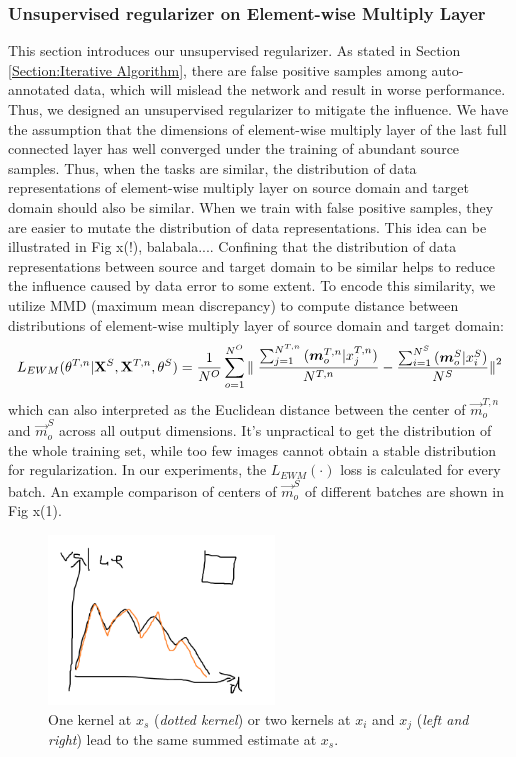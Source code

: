 \documentclass[runningheads]{llncs}
\begin{document}
\subsubsection{Unsupervised regularizer on Element-wise Multiply Layer}

This section introduces our unsupervised regularizer. As stated in Section \ref{Section:Iterative Algorithm}, there are false positive samples among auto-annotated data, which will mislead the network and result in worse performance. Thus, we designed an unsupervised regularizer to mitigate the influence. We have the assumption that the dimensions of element-wise multiply layer of the last full connected layer has well converged under the training of abundant source samples. Thus, when the tasks are similar, the distribution of data representations of element-wise multiply layer on source domain and target domain should also be similar. When we train with false positive samples, they are easier to mutate the distribution of data representations. This idea can be illustrated in Fig x(!), balabala.... Confining that the distribution of data representations between source and target domain to be similar helps to reduce the influence caused by data error to some extent. To encode this similarity, we utilize MMD (maximum mean discrepancy) to compute distance between distributions of element-wise multiply layer of source domain and target domain:
\begin{equation}\label{equation:LMMD}
  L_{EWM}(\theta^{T,n}|{\bf X}^{S},{\bf X}^{T,n},\theta^{S}) = \frac{1}{N^{O}} \sum^{N^{O}}_{o=1}{ \parallel \frac{\sum^{N^{T,n}}_{j=1}{(\vec{m}^{T,n}_{o}|x^{T,n}_{j})}}{N^{T,n}} - \frac{\sum^{N^{S}}_{i=1}{(\vec{m}^{S}_{o}|x^{S}_{i})}}{N^{S}} {\parallel}^{2}  }
\end{equation}
which can also interpreted as the Euclidean distance between the center of $\vec{m}^{T,n}_{o}$ and $\vec{m}^{S}_{o}$ across all output dimensions. It's unpractical to get the distribution of the whole training set, while too few images cannot obtain a stable distribution for regularization. In our experiments, the $L_{EWM}(\cdot)$ loss is calculated for every batch. An example comparison of centers of $\vec{m}^{S}_{o}$ of different batches are shown in Fig x(1).

\begin{figure}
\centering
\includegraphics[height=4.5cm]{images/mmd.png}
\caption{One kernel at $x_s$ ({\it dotted kernel}) or two kernels at
$x_i$ and $x_j$ ({\it left and right}) lead to the same summed estimate
at $x_s$. }
\label{fig:example}
\end{figure}
\end{document}

